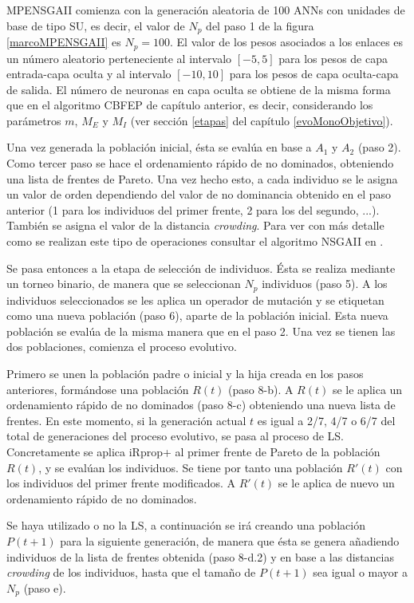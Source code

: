 MPENSGAII comienza con la generación aleatoria de 100 ANNs con unidades de base de tipo
SU, es decir, el valor
de $N_{p}$ del paso 1 de la figura \ref{marcoMPENSGAII} es $N_{p}=100$. El valor de los
pesos asociados a los enlaces es un número aleatorio perteneciente al intervalo $\left[
-5,5\right] $ para los pesos de capa entrada-capa oculta y al intervalo $\left[
-10,10\right] $ para los pesos de capa
oculta-capa de salida. El número de neuronas en capa oculta se obtiene de la misma forma
que en el algoritmo CBFEP de capítulo anterior, es decir, considerando los parámetros
$m$, $M_{E}$ y $M_{I}$ (ver sección \ref{etapas} del capítulo \ref{evoMonoObjetivo}).

Una vez generada la población inicial, ésta se evalúa en base a
$A_{1}$ y $A_{2}$ (paso 2). Como tercer paso se hace el ordenamiento rápido de no
dominados, obteniendo una lista de frentes de Pareto. Una vez hecho esto, a cada individuo
se le asigna un valor de orden dependiendo del valor de no dominancia obtenido
en el paso anterior (1 para los individuos del primer frente, 2 para los del segundo,
...). También se asigna el valor de la distancia \textit{crowding}. Para ver con más
detalle como se realizan este tipo de operaciones consultar el algoritmo NSGAII
en \cite{Deb2002}.

Se pasa entonces a la etapa de selección de individuos. Ésta se realiza mediante un
torneo binario, de manera que se seleccionan $N_{p}$ individuos (paso 5). A los
individuos seleccionados se les aplica un operador de mutación y se etiquetan como una
nueva población (paso 6), aparte de la población inicial. Esta nueva población se evalúa
de la misma manera que en el paso 2. Una vez se tienen las dos poblaciones, comienza el
proceso evolutivo.

Primero se unen la población padre o inicial y la hija creada en los pasos anteriores,
formándose una población $R(t)$ (paso 8-b). A $R(t)$ se le aplica un ordenamiento rápido
de no dominados (paso 8-c) obteniendo una nueva lista de frentes. En este momento, si la
generación actual $t$ es igual a 2/7, 4/7 o 6/7 del total de generaciones del proceso
evolutivo, se pasa al proceso de LS. Concretamente se aplica iRprop+ al primer
frente de Pareto de la población  $R(t)$, y se evalúan los individuos. Se tiene por tanto
una población $R'(t)$  con los individuos del primer frente modificados. A $R'(t)$ se le
aplica de nuevo un ordenamiento rápido de no dominados.

Se haya utilizado o no la LS, a continuación se irá creando una
población $P(t+1)$ para la siguiente generación, de manera que ésta se genera
añadiendo individuos de la lista de frentes obtenida (paso 8-d.2) y en base a las
distancias \textit{crowding} de los individuos, hasta que el tamaño de $P(t+1)$ sea igual
o mayor a $N_{p}$ (paso e).

